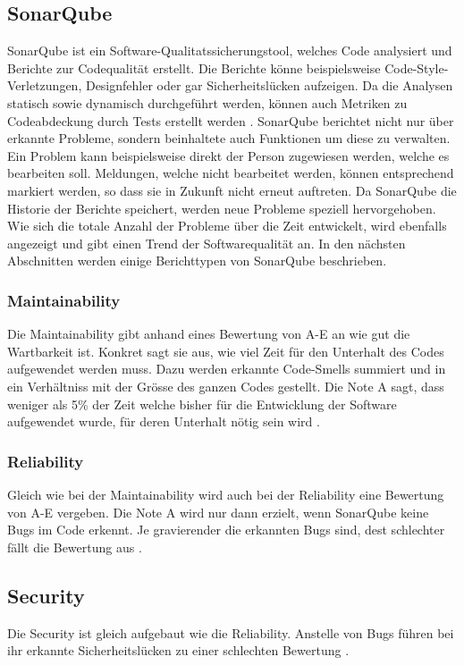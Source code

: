 \subsection{SonarQube}\label{quality:sonar}
SonarQube ist ein Software-Qualitatssicherungstool, welches Code analysiert und Berichte zur Codequalität erstellt.
Die Berichte könne beispielsweise Code-Style-Verletzungen, Designfehler oder gar Sicherheitslücken aufzeigen.
Da die Analysen statisch sowie dynamisch durchgeführt werden, können auch Metriken zu Codeabdeckung durch Tests erstellt werden \parencite{malloy_2021}.
SonarQube berichtet nicht nur über erkannte Probleme, sondern beinhaltete auch Funktionen um diese zu verwalten.
Ein Problem kann beispielsweise direkt der Person zugewiesen werden, welche es bearbeiten soll.
Meldungen, welche nicht bearbeitet werden, können entsprechend markiert werden, so dass sie in Zukunft nicht erneut auftreten.
Da SonarQube die Historie der Berichte speichert, werden neue Probleme speziell hervorgehoben.
Wie sich die totale Anzahl der Probleme über die Zeit entwickelt, wird ebenfalls angezeigt und gibt einen Trend der Softwarequalität an.
In den nächsten Abschnitten werden einige Berichttypen von SonarQube beschrieben.


\subsubsection{Maintainability}
Die Maintainability gibt anhand eines Bewertung von A-E an wie gut die Wartbarkeit ist.
Konkret sagt sie aus, wie viel Zeit für den Unterhalt des Codes aufgewendet werden muss.
Dazu werden erkannte Code-Smells summiert und in ein Verhältniss mit der Grösse des ganzen Codes gestellt.
Die Note A sagt, dass weniger als 5\% der Zeit welche bisher für die Entwicklung der Software aufgewendet wurde, für deren Unterhalt nötig sein wird \parencite{sonarQubeMetrics}.

\subsubsection{Reliability}
Gleich wie bei der Maintainability wird auch bei der Reliability eine Bewertung von A-E vergeben.
Die Note A wird nur dann erzielt, wenn SonarQube keine Bugs im Code erkennt.
Je gravierender die erkannten Bugs sind, dest schlechter fällt die Bewertung aus \parencite{sonarQubeMetrics}.

\subsection{Security}
Die Security ist gleich aufgebaut wie die Reliability.
Anstelle von Bugs führen bei ihr erkannte Sicherheitslücken zu einer schlechten Bewertung \parencite{sonarQubeMetrics}.

